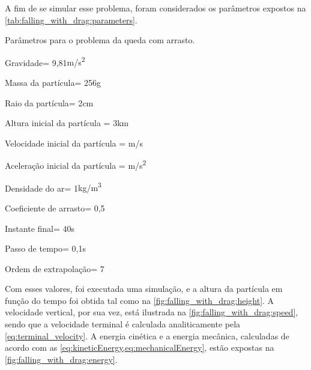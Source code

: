A fim de se simular esse problema, foram considerados os parâmetros expostos na \cref{tab:falling_with_drag:parameters}. 

\begin{table}[h]
\centering
\caption{Parâmetros para o problema da queda com arrasto.}
\label{tab:falling_with_drag:parameters}
\begin{parametersdesc}
	\item{Gravidade}{\gravityScalar = 9,81}{\si[per-mode=symbol]{\metre\per\square\second}}
	\hline
	\item{Massa da partícula}{\mass = 256}{\si\gram}
	\item{Raio da partícula}{\radius = 2}{\si\centi\metre}
	\item{Altura inicial da partícula}{\initial{\positiony} = 3}{\si{\kilo\metre}}
	\item{Velocidade inicial da partícula}{\explicitVector{\initial{\velocityx}}{\initial{\velocityy}}{\initial{\velocityz}} = }{\si[per-mode=symbol]{\metre\per\second}}
	\item{Aceleração inicial da partícula}{\explicitVector{\initial{\accelerationx}}{\initial{\accelerationy}}{\initial{\accelerationz}} = }{\si[per-mode=symbol]{\metre\per\square\second}}
	\hline
	\item{Densidade do ar}{\density = 1}{\si[per-mode=symbol]{\kilogram\per\cubic\meter}}
	\item{Coeficiente de arrasto}{\dragCoefficient = 0,5}{\emptyUnit}
	\hline
	\item{Instante final}{\finalInstant = 40}{\si\second} 
	\item{Passo de tempo}{\Dt = 0,1}{\si\second}
	\item{Ordem de extrapolação}{\taylorOrder = 7}{\emptyUnit}
\end{parametersdesc}
\sourceMe 
\end{table}

Com esses valores, foi executada uma simulação, e a altura da partícula em função do tempo foi obtida tal como na \cref{fig:falling_with_drag:height}. A velocidade vertical, por sua vez, está ilustrada na \cref{fig:falling_with_drag:speed}, sendo que a velocidade terminal é calculada analiticamente pela \cref{eq:terminal_velocity}. A energia cinética e a energia mecânica, calculadas de acordo com as \cref{eq:kineticEnergy,eq:mechanicalEnergy}, estão expostas na \cref{fig:falling_with_drag:energy}.

